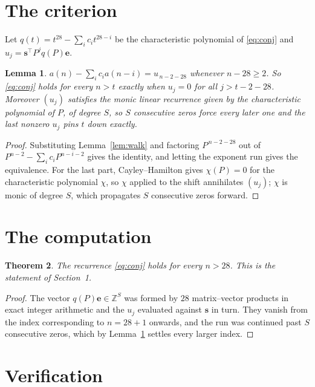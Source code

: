 \documentclass[11pt,a4paper]{article}
\theoremstyle{plain}
\newtheorem{theorem}{Theorem}
\newtheorem{lemma}[theorem]{Lemma}
\theoremstyle{definition}
\begin{document}
\section{The criterion}

Let $q(t)=t^{28}-\sum_i c_i t^{28-i}$ be the characteristic polynomial of
\eqref{eq:conj} and $u_j=\mathbf{s}^{\!\top}P^{j}q(P)\mathbf{e}$.

\begin{lemma}\label{lem:crit}
$a(n)-\sum_i c_i a(n-i)=u_{\,n-2-28}$ whenever $n-28\ge2$. So \eqref{eq:conj}
holds for every $n>t$ exactly when $u_j=0$ for all $j>t-2-28$. Moreover $(u_j)$
satisfies the monic linear recurrence given by the characteristic polynomial of $P$, of
degree $S$, so $S$ consecutive zeros force every later one and the last nonzero $u_j$ pins
$t$ down exactly.
\end{lemma}

\begin{proof}
Substituting Lemma~\ref{lem:walk} and factoring $P^{\,n-2-28}$ out of
$P^{n-2}-\sum_i c_i P^{n-i-2}$ gives the identity, and letting the exponent run gives the
equivalence. For the last part, Cayley--Hamilton gives $\chi(P)=0$ for the characteristic
polynomial $\chi$, so $\chi$ applied to the shift annihilates $(u_j)$; $\chi$ is monic of
degree $S$, which propagates $S$ consecutive zeros forward.
\end{proof}

\section{The computation}

\begin{theorem}
The recurrence \eqref{eq:conj} holds for every $n>28$. This is the statement of
Section~1.
\end{theorem}

\begin{proof}
The vector $q(P)\mathbf{e}\in\mathbb{Z}^{S}$ was formed by $28$ matrix--vector
products in exact integer arithmetic and the $u_j$ evaluated against $\mathbf{s}$ in turn.
They vanish from the index corresponding to $n=28+1$ onwards, and the run was continued
past $S$ consecutive zeros, which by Lemma~\ref{lem:crit} settles every larger index.
\end{proof}

\section{Verification}
\end{document}
